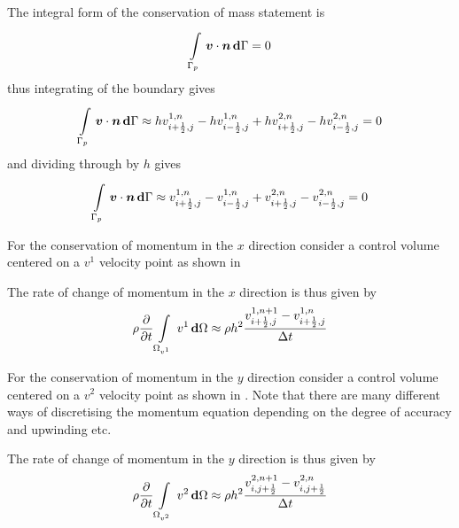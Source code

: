 The integral form of the conservation of mass statement is
\begin{equation}
    \displaystyle\int\limits_{\Gamma_{p}}^{} \,\boldsymbol{v}\cdot\boldsymbol{n}\, \boldsymbol{\mathrm{d}} \Gamma =0
\end{equation}
thus integrating of the boundary gives
\begin{equation}
    \displaystyle\int\limits_{\Gamma_{p}}^{} \,\boldsymbol{v}\cdot\boldsymbol{n}\, \boldsymbol{\mathrm{d}} \Gamma \approx hv^{1,n}_{i+\frac{1}{2},j}-hv^{1,n}_{i-\frac{1}{2},j}+hv^{2,n}_{i+\frac{1}{2},j}-hv^{2,n}_{i-\frac{1}{2},j}=0
\end{equation}
and dividing through by $h$ gives
\begin{equation}
    \displaystyle\int\limits_{\Gamma_{p}}^{} \,\boldsymbol{v}\cdot\boldsymbol{n}\, \boldsymbol{\mathrm{d}} \Gamma \approx v^{1,n}_{i+\frac{1}{2},j}-v^{1,n}_{i-\frac{1}{2},j}+v^{2,n}_{i+\frac{1}{2},j}-v^{2,n}_{i-\frac{1}{2},j}=0
\end{equation}

For the conservation of momentum in the $x$ direction consider a control
volume centered on a $v^{1}$ velocity point as shown in 


The rate of change of momentum in the $x$ direction is thus given by
\begin{equation}
  \rho \dfrac{\partial }{\partial t}   \displaystyle\int\limits_{\Omega_{v^{1}}}^{} \,v^{1}\, \boldsymbol{\mathrm{d}} \Omega \approx\rho h^{2}\dfrac{v^{1,n+1}_{i+\frac{1}{2},j}-v^{1,n}_{i+\frac{1}{2},j}}{\Delta
  t}
\end{equation}

For the conservation of momentum in the $y$ direction consider a control
volume centered on a $v^{2}$ velocity point as shown in
. Note that there are many different ways of discretising the
momentum equation depending on the degree of accuracy and upwinding etc. 


The rate of change of momentum in the $y$ direction is thus given by
\begin{equation}
  \rho \dfrac{\partial }{\partial t}   \displaystyle\int\limits_{\Omega_{v^{2}}}^{} \,v^{2}\, \boldsymbol{\mathrm{d}} \Omega \approx\rho h^{2}\dfrac{v^{2,n+1}_{i,j+\frac{1}{2}}-v^{2,n}_{i,j+\frac{1}{2}}}{\Delta
  t}
\end{equation}

